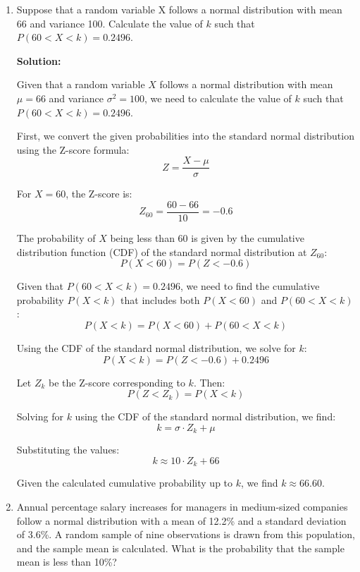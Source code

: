 \documentclass[12pt]{article}
\begin{document}
\begin{enumerate}
{Therefore, the probability that the value of the portfolio is between €485,000 and €530,000 is 0.8185.

Here, we will use R to calculate the probability:

\begin{lstlisting}[language=R, basicstyle=\ttfamily]
z1 <- -1
z2 <- 2
pnorm(z2) - pnorm(z1)
\end{lstlisting}


}

\item   Suppose that a random variable X follows a normal distribution with mean 66 and variance 100. Calculate the value of $k$ such that $P(60<X<k)=0.2496$.

{\color{blue}
\noindent \textbf{Solution:}

Given that a random variable $X$ follows a normal distribution with mean $\mu = 66$ and variance $\sigma^2 = 100$, we need to calculate the value of $k$ such that $P(60 < X < k) = 0.2496$.

First, we convert the given probabilities into the standard normal distribution using the Z-score formula:
\[ Z = \frac{X - \mu}{\sigma} \]

For $X = 60$, the Z-score is:
\[ Z_{60} = \frac{60 - 66}{10} = -0.6 \]

The probability of $X$ being less than 60 is given by the cumulative distribution function (CDF) of the standard normal distribution at $Z_{60}$:
\[ P(X < 60) = P(Z < -0.6) \]

Given that $P(60 < X < k) = 0.2496$, we need to find the cumulative probability $P(X < k)$ that includes both $P(X < 60)$ and $P(60 < X < k)$:
\[ P(X < k) = P(X < 60) + P(60 < X < k) \]

Using the CDF of the standard normal distribution, we solve for $k$:
\[ P(X < k) = P(Z < -0.6) + 0.2496 \]

Let $Z_k$ be the Z-score corresponding to $k$. Then:
\[ P(Z < Z_k) = P(X < k) \]

Solving for $k$ using the CDF of the standard normal distribution, we find:
\[ k = \sigma \cdot Z_k + \mu \]

Substituting the values:
\[ k \approx 10 \cdot Z_k + 66 \]

Given the calculated cumulative probability up to $k$, we find $k \approx 66.60$.

}

\item   Annual percentage salary increases for managers in medium-sized companies follow a normal distribution with a mean of 12.2\% and a standard deviation of 3.6\%. A random sample of nine observations is drawn from this population, and the sample mean is calculated. What is the probability that the sample mean is less than 10\%?


\end{enumerate}
\end{document}
